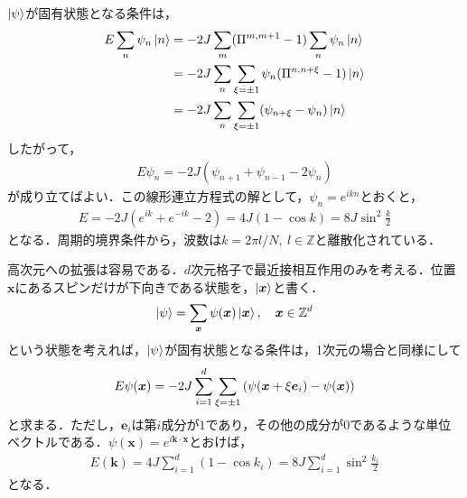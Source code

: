 \documentclass[../main.tex]{subfiles}
\begin{document}
\begin{frame}
    $\ket{\psi}$が固有状態となる条件は，
    \begin{align}
        \nonumber
        E \sum_n \psi_n \ket{n} &= -2J \sum_m(\Pi^{m,m+1}-1)\sum_n \psi_n\ket{n}
        \\ & \nonumber
        = -2J \sum_n \sum_{\xi= \pm1} \psi_n (\Pi^{n,n+\xi}-1)\ket{n}
        \\ &
        = -2J \sum_n \sum_{\xi=\pm 1}(\psi_{n+\xi}-\psi_n)\ket{n}
    \end{align}
    したがって，
    \begin{align}
        E\psi_n = -2J(\psi_{n+1}+\psi_{n-1}-2\psi_n)
    \end{align}
    が成り立てばよい．この線形連立方程式の解として，$\psi_n = e^{ikn}$とおくと，
    \begin{align}
        E = -2J(e^{ik} + e^{-ik}-2) = 4J(1-\cos k) = 8J \sin^2 \frac{k}{2}
    \end{align}
    となる．周期的境界条件から，波数は$k = 2\pi l/N,~ l \in \mathbb{Z}$と離散化されている．
\end{frame}

\begin{frame}
    高次元への拡張は容易である．$d$次元格子で最近接相互作用のみを考える．位置$\bm{x}$にあるスピンだけが下向きである状態を，$\ket{\bm{x}}$と書く．
    \begin{align}
        \ket{\psi} = \sum_{\bm{x}}\psi(\bm{x})\ket{\bm{x}}, \quad
        \bm{x}\in \mathbb{Z}^d
    \end{align}
    という状態を考えれば，$\ket{\psi}$が固有状態となる条件は，1次元の場合と同様にして
    \begin{gather}
        E\psi(\bm{x}) = -2J \sum_{i = 1}^d \sum_{\xi = \pm 1} \qty(\psi(\bm{x} + \xi\bm{e}_i) - \psi(\bm{x}))
        \label{Bloch theory: 1 spin wave condition}
    \end{gather}
    と求まる．ただし，$\bm{e}_i$は第$i$成分が$1$であり，その他の成分が$0$であるような単位ベクトルである．$\psi(\bm{x}) = e^{i\bm{k} \cdot \bm{x}}$とおけば，
    \begin{align}
        E(\bm{k}) = 4J \sum_{i=1}^d (1- \cos k_i) =
        8J \sum_{i=1}^d \sin^2 \frac{k_i}{2}
    \end{align}
    となる．
\end{frame}
\end{document}
